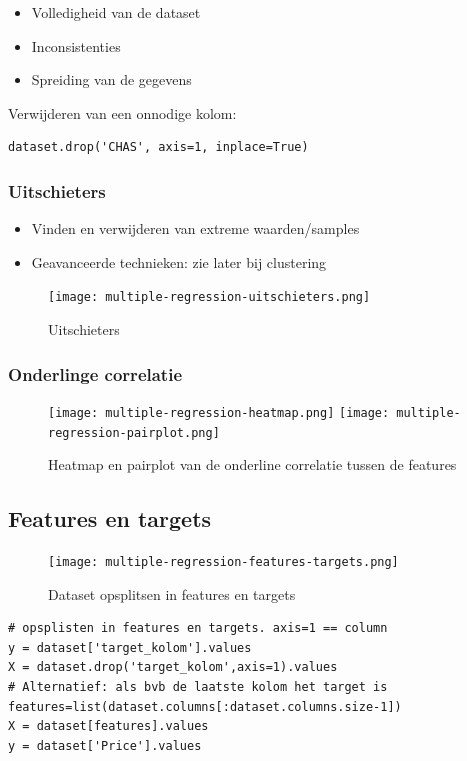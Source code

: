 \documentclass{article}
\begin{document}
\begin{itemize}
    \item Volledigheid van de dataset
    \item Inconsistenties
    \item Spreiding van de gegevens
\end{itemize}

Verwijderen van een onnodige kolom:

\begin{verbatim}
dataset.drop('CHAS', axis=1, inplace=True)
\end{verbatim}

\subsubsection{Uitschieters}

\begin{itemize}
    \item Vinden en verwijderen van extreme waarden/samples
    \item Geavanceerde technieken: zie later bij clustering
\end{itemize}

\begin{figure}[H]
    \centering
    \texttt{[image: multiple-regression-uitschieters.png]}
    \caption{Uitschieters}
\end{figure}


\subsubsection{Onderlinge correlatie}

\begin{figure}[H]
    \centering
    \texttt{[image: multiple-regression-heatmap.png]}
    \texttt{[image: multiple-regression-pairplot.png]}
    \caption{Heatmap en pairplot van de onderline correlatie tussen de features}
\end{figure}

\subsection{Features en targets}

\begin{figure}[H]
    \centering
    \texttt{[image: multiple-regression-features-targets.png]}
    \caption{Dataset opsplitsen in features en targets}
\end{figure}

\begin{verbatim}
# opsplisten in features en targets. axis=1 == column
y = dataset['target_kolom'].values
X = dataset.drop('target_kolom',axis=1).values
# Alternatief: als bvb de laatste kolom het target is
features=list(dataset.columns[:dataset.columns.size-1])
X = dataset[features].values
y = dataset['Price'].values
\end{verbatim}
\end{document}
